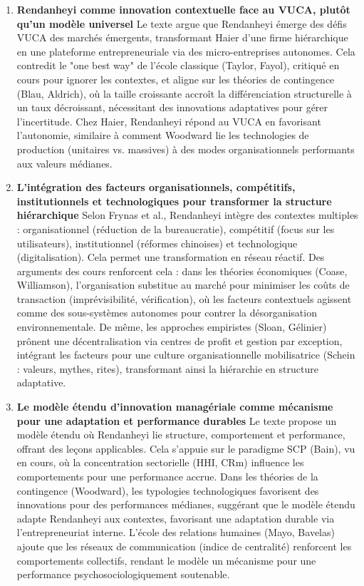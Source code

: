 \documentclass{rapportECL}
\begin{document}
\begin{enumerate}
\item \textbf{Rendanheyi comme innovation contextuelle face au VUCA, plutôt qu'un modèle universel}  
Le texte argue que Rendanheyi émerge des défis VUCA des marchés émergents, transformant Haier d'une firme hiérarchique en une plateforme entrepreneuriale via des micro-entreprises autonomes. Cela contredit le "one best way" de l'école classique (Taylor, Fayol), critiqué en cours pour ignorer les contextes, et aligne sur les théories de contingence (Blau, Aldrich), où la taille croissante accroît la différenciation structurelle à un taux décroissant, nécessitant des innovations adaptatives pour gérer l'incertitude. Chez Haier, Rendanheyi répond au VUCA en favorisant l'autonomie, similaire à comment Woodward lie les technologies de production (unitaires vs. massives) à des modes organisationnels performants aux valeurs médianes.

\item \textbf{L'intégration des facteurs organisationnels, compétitifs, institutionnels et technologiques pour transformer la structure hiérarchique}  
Selon Frynas et al., Rendanheyi intègre des contextes multiples : organisationnel (réduction de la bureaucratie), compétitif (focus sur les utilisateurs), institutionnel (réformes chinoises) et technologique (digitalisation). Cela permet une transformation en réseau réactif. Des arguments des cours renforcent cela : dans les théories économiques (Coase, Williamson), l'organisation substitue au marché pour minimiser les coûts de transaction (imprévisibilité, vérification), où les facteurs contextuels agissent comme des sous-systèmes autonomes pour contrer la désorganisation environnementale. De même, les approches empiristes (Sloan, Gélinier) prônent une décentralisation via centres de profit et gestion par exception, intégrant les facteurs pour une culture organisationnelle mobilisatrice (Schein : valeurs, mythes, rites), transformant ainsi la hiérarchie en structure adaptative.

\item \textbf{Le modèle étendu d'innovation managériale comme mécanisme pour une adaptation et performance durables}  
Le texte propose un modèle étendu où Rendanheyi lie structure, comportement et performance, offrant des leçons applicables. Cela s'appuie sur le paradigme SCP (Bain), vu en cours, où la concentration sectorielle (HHI, CRm) influence les comportements pour une performance accrue. Dans les théories de la contingence (Woodward), les typologies technologiques favorisent des innovations pour des performances médianes, suggérant que le modèle étendu adapte Rendanheyi aux contextes, favorisant une adaptation durable via l'entrepreneuriat interne. L'école des relations humaines (Mayo, Bavelas) ajoute que les réseaux de communication (indice de centralité) renforcent les comportements collectifs, rendant le modèle un mécanisme pour une performance psychosociologiquement soutenable.
\end{enumerate}
\end{document}
